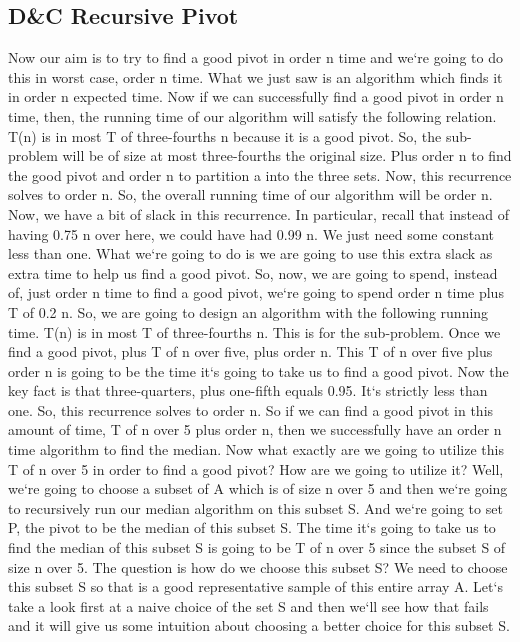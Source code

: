 \subsection{D\&C  Recursive Pivot}
Now our aim is to try to find a good pivot in order n time and we`re going to do this in worst case, order n time.
What we just saw is an algorithm which finds it in order n expected time.
Now if we can successfully find a good pivot in order n time, then, the running time of our algorithm will satisfy the following relation.
T(n) is in most T of three-fourths n because it is a good pivot.
So, the sub-problem will be of size at most three-fourths the original size.
Plus order n to find the good pivot and order n to partition a into the three sets.
Now, this recurrence solves to order n.
So, the overall running time of our algorithm will be order n.
Now, we have a bit of slack in this recurrence.
In particular, recall that instead of having 0.75 n over here, we could have had 0.99 n.
We just need some constant less than one.
What we`re going to do is we are going to use this extra slack as extra time to help us find a good pivot.
So, now, we are going to spend, instead of, just order n time to find a good pivot, we`re going to spend order n time plus T of 0.2 n.
So, we are going to design an algorithm with the following running time.
T(n) is in most T of three-fourths n.
This is for the sub-problem.
Once we find a good pivot, plus T of n over five, plus order n.
This T of n over five plus order n is going to be the time it`s going to take us to find a good pivot.
Now the key fact is that three-quarters, plus one-fifth equals 0.95.
It`s strictly less than one.
So, this recurrence solves to order n.
So if we can find a good pivot in this amount of time, T of n over 5 plus order n, then we successfully have an order n time algorithm to find the median.
Now what exactly are we going to utilize this T of n over 5 in order to find a good pivot? How are we going to utilize it? Well, we`re going to choose a subset of A which is of size n over 5 and then we`re going to recursively run our median algorithm on this subset S\@.
And we`re going to set P, the pivot to be the median of this subset S\@.
The time it`s going to take us to find the median of this subset S is going to be T of n over 5 since the subset S of size n over 5.
The question is how do we choose this subset S? We need to choose this subset S so that is a good representative sample of this entire array A\@.
Let`s take a look first at a naive choice of the set S and then we`ll see how that fails and it will give us some intuition about choosing a better choice for this subset S\@.

